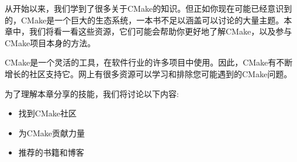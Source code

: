 从开始以来，我们学到了很多关于CMake的知识。但正如你现在可能已经意识到的，CMake是一个巨大的生态系统，一本书不足以涵盖可以讨论的大量主题。本章中，我们将看一看这些资源，它们可能会帮助你更好地了解CMake，以及参与CMake项目本身的方法。

CMake是一个灵活的工具，在软件行业的许多项目中使用。因此，CMake有不断增长的社区支持它。网上有很多资源可以学习和排除您可能遇到的CMake问题。

为了理解本章分享的技能，我们将讨论以下内容:

\begin{itemize}
\item 
找到CMake社区

\item 
为CMake贡献力量

\item 
推荐的书籍和博客
\end{itemize}

